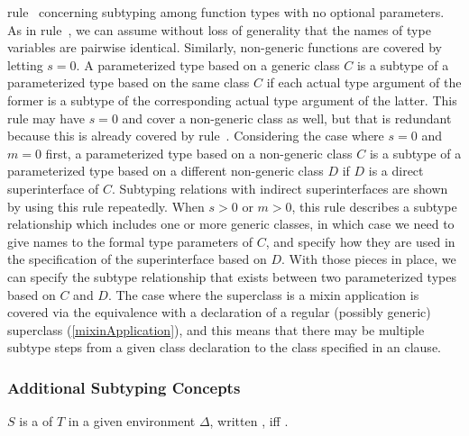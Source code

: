 \documentclass[makeidx]{article}
\begin{document}
{{\begin{itemize}
    rule~\SrnPositionalFunctionType{}
    concerning subtyping among function types with no optional parameters.
    As in rule~\SrnPositionalFunctionType,
    we can assume without loss of generality
    that the names of type variables are pairwise identical.
    Similarly, non-generic functions are covered by letting $s = 0$.
    A parameterized type based on a generic class $C$ is a subtype of
    a parameterized type based on the same class $C$ if
    each actual type argument of the former is a subtype of
    the corresponding actual type argument of the latter.
    This rule may have $s = 0$ and cover a non-generic class as well,
    but that is redundant because this is already covered by
    rule~\SrnReflexivity.
    Considering the case where $s = 0$ and $m = 0$ first,
    a parameterized type based on a non-generic class $C$ is a subtype of
    a parameterized type based on a different non-generic class $D$ if
    $D$ is a direct superinterface of $C$.
    Subtyping relations with indirect superinterfaces are shown by
    using this rule repeatedly.
    When $s > 0$ or $m > 0$, this rule describes a subtype relationship
    which includes one or more generic classes,
    in which case we need to give names to the formal type parameters of $C$,
    and specify how they are used in the specification of the superinterface
    based on $D$.
    With those pieces in place, we can specify the subtype relationship
    that exists between two parameterized types based on $C$ and $D$.
    The case where the superclass is a mixin application is covered via
    the equivalence with a declaration of
    a regular (possibly generic) superclass
    (\ref{mixinApplication}),
    and this means that there may be multiple subtype steps from
    a given class declaration to the class specified in an \EXTENDS{} clause.
  \end{itemize}%
}

\subsubsection{Additional Subtyping Concepts}

\LMHash{}%
$S$ is a  of $T$ in a given environment $\Delta$,
written
,
if{}f .

}
\end{document}
